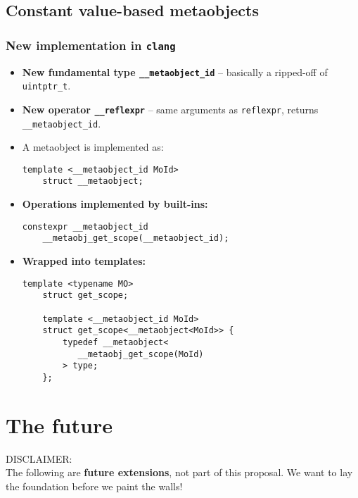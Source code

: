 \documentclass[compress,table,xcolor=table]{beamer}
\begin{document}
\subsection{Constant value-based metaobjects}
\begin{frame}[fragile]
\frametitle{New implementation in \texttt{clang}}
  \large
  \begin{itemize}
    \item \textbf{New fundamental type \texttt{\_\_metaobject\_id}} -- basically
      a ripped-off of \texttt{uintptr\_t}.
    \item \textbf{New operator \texttt{\_\_reflexpr}} -- same arguments as
      \texttt{reflexpr}, returns \texttt{\_\_metaobject\_id}.
    \item A metaobject is implemented as:
    \begin{lstlisting}[basicstyle=\ttfamily\normalsize]
	template <__metaobject_id MoId>
	struct __metaobject;
    \end{lstlisting}
  \end{itemize}
\end{frame}

\begin{frame}[fragile]
  \large
  \begin{itemize}
    \item \textbf{Operations implemented by built-ins:}
    \begin{lstlisting}[basicstyle=\ttfamily\normalsize]
	constexpr __metaobject_id
	__metaobj_get_scope(__metaobject_id);
    \end{lstlisting}
    \item \textbf{Wrapped into templates:}
    \begin{lstlisting}[basicstyle=\ttfamily\normalsize]
	template <typename MO>
	struct get_scope;

	template <__metaobject_id MoId>
	struct get_scope<__metaobject<MoId>> {
	    typedef __metaobject<
	       __metaobj_get_scope(MoId)
	    > type;
	};
    \end{lstlisting}
  \end{itemize}
\end{frame}

\section{The future}

\begin{frame}
\begin{center}
\Huge \alert{DISCLAIMER:}\\
\Large The following are \textbf{future extensions}, not part of this
proposal. We want to lay the foundation before we paint the walls!\\
\normalsize
\end{center}
\end{frame}
\end{document}
